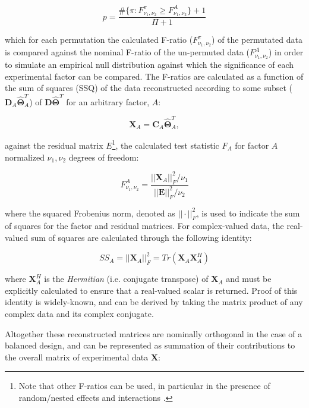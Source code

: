 \documentclass[preprint,12pt]{elsarticle}
\begin{document}
\begin{equation}
p = \frac{\#\{\pi:F^\pi_{\nu_1,\nu_2} \geq F^{A}_{\nu_1,\nu_2}\} + 1}{\Pi+1}
\end{equation}

\noindent which for each permutation the calculated F-ratio ($F^\pi_{\nu_1,\nu_2}$) of the permutated data is compared against the nominal F-ratio of the un-permuted data ($F^{A}_{\nu_1,\nu_2}$) in order to simulate an empirical null distribution against which the significance of each experimental factor can be compared. The F-ratios are calculated as a function of the sum of squares (SSQ) of the data reconstructed according to some subset ($\mathbf{D}_A\mathbf{\hat{\Theta}}_A^T$) of $\mathbf{D}\mathbf{\hat{\Theta}}^T$ for an arbitrary factor, $A$:

\begin{equation}
    \mathbf{X}_A = \mathbf{C}_A\mathbf{\hat{\Theta}}^T_A,
\end{equation}

\noindent against the residual matrix $E$\footnote{Note that other F-ratios can be used, in particular in the presence of random/nested effects and interactions \cite{anderson2014permutational}.}, the calculated test statistic $F_A$ for factor $A$ normalized $\nu_1, \nu_2$ degrees of freedom:

 \begin{equation}\label{eq:sig_test}
    F^A_{\nu_1,\nu_2} = \frac{||\mathbf{X}_A||_F^2/\nu_1}{||\mathbf{E}||^2_F/\nu_2}
\end{equation}

\noindent where the squared Frobenius norm, denoted as $||\cdot||^2_F$, is used to indicate the sum of squares for the factor and residual matrices. For complex-valued data, the real-valued sum of squares are calculated through the following identity:

\begin{equation}\label{eq:ssq}
    SS_A = ||\mathbf{X}_A||^2_F = Tr(\mathbf{X}_A\mathbf{X}_A^H)
\end{equation}

\noindent where $\mathbf{X}^H_A$ is the \textit{Hermitian} (i.e. conjugate transpose) of $\mathbf{X}_A$ and must be explicitly calculated to ensure that a real-valued scalar is returned. Proof of this identity is widely-known, and can be derived by taking the matrix product of any complex data and its complex conjugate.

Altogether these reconstructed matrices are nominally orthogonal in the case of a balanced design, and can be represented as summation of their contributions to the overall matrix of experimental data $\mathbf{X}$:
\end{document}
